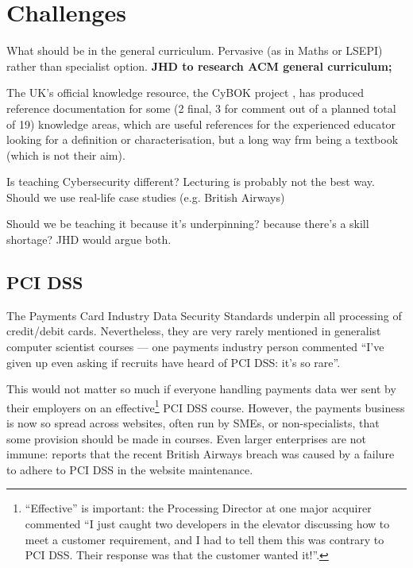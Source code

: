 \documentclass[sigconf,anonymous]{acmart}
\begin{document}
\section{Challenges}

What should be in the general curriculum.  Pervasive (as in Maths or LSEPI) rather than specialist option.  
{\bf JHD to research ACM general curriculum;}

The UK's official knowledge resource, the CyBOK project \cite{Bristol2019a}, has produced reference documentation for some (2 final, 3 for comment out of a planned total of 19) knowledge areas, which are useful references for the experienced educator looking for a definition or characterisation, but a long way frm being a textbook (which is not their aim).

Is teaching Cybersecurity different? Lecturing is probably not the best way. Should we use real-life case studies (e.g. British Airways)

  Should we be teaching it because it's underpinning? because there's a skill shortage?  JHD would argue both.


\subsection{PCI DSS}\label{sec:PCIDSS}
The Payments Card Industry Data Security Standards \cite{PCI2018b} underpin all processing of credit/debit cards. Nevertheless, they are very rarely mentioned in generalist computer scientist courses --- one payments industry person commented ``I've given up even asking if recruits have heard of PCI DSS: it's so rare''. 

This would not matter so much if everyone handling payments data wer sent by their employers on an effective\footnote{``Effective'' is important: the Processing Director at one major acquirer commented ``I just caught two developers in the elevator discussing how to meet a customer requirement, and I had to tell them this was contrary to PCI DSS. Their response was that the customer wanted it!''.} PCI DSS course. However, the payments business is now so spread across websites, often run by SMEs, or non-specialists, that some provision should be made in courses.  Even larger enterprises are not immune: \cite{Barth2018a} reports that the recent British Airways breach was caused by a failure to adhere to PCI DSS in the website maintenance.
\end{document}
